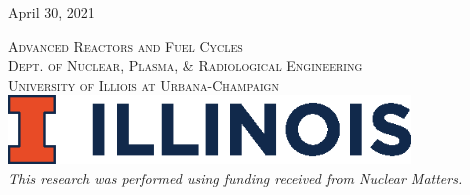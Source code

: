 \begin{titlepage}
    \vspace{0.5cm} %
    {\large April 30, 2021} %
    \vspace{0.5cm}


    \textsc{\LARGE Advanced Reactors and Fuel Cycles}\\[0.25cm] %

    \textsc{\large Dept. of Nuclear, Plasma, \& Radiological Engineering}\\%

    \textsc{\large University of Illiois at Urbana-Champaign}\\ %




    \vspace{0.5cm}
    \includegraphics[width=0.8\textwidth]{./img/illinois.eps}\\[1cm] %


    \textit{This research was performed using funding received from Nuclear
    Matters.}

\end{titlepage}






\FloatBarrier




